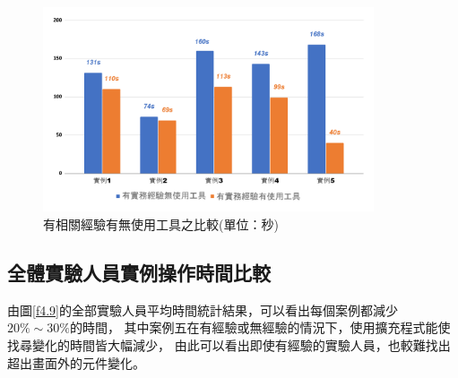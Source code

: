 \begin{figure}[H]
    \centering
    \setlength{\abovecaptionskip}{-15pt}
    \setlength{\belowcaptionskip}{0pt}
    \includegraphics[width=0.87\textwidth]{picture/experiment/ch4-have_experience_compare.png}
    \caption{有相關經驗有無使用工具之比較(單位：秒)}
    \label{f4.8}
\end{figure}

\subsection{全體實驗人員實例操作時間比較}\label{s4.3.3}

由圖\ref{f4.9}的全部實驗人員平均時間統計結果，可以看出每個案例都減少$20\%\sim30\%$的時間，
其中案例五在有經驗或無經驗的情況下，使用擴充程式能使找尋變化的時間皆大幅減少，
由此可以看出即使有經驗的實驗人員，也較難找出超出畫面外的元件變化。

